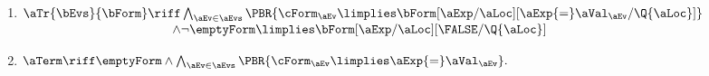\begin{definition}
\begin{multicols}{2}
\begin{enumerate}[topsep=0pt,label=(\textsc{w}\arabic*),ref=\textsc{w}\arabic*]
    
  \item \label{write-tau-ca}
    \begin{math}
      \begin{aligned}[t]
        \aTr{\bEvs}{\bForm} \riff
        &\textstyle\bigwedge_{\aEv\in\aEvs}
        \PBR{
          \cForm_\aEv
          \limplies 
          \bForm[\aExp/\aLoc][\aExp{=}\aVal_\aEv/\Q{\aLoc}]
        }
        \\[-.5ex]
        \land
        &
        \lnot \emptyForm
        \limplies 
        \bForm[\aExp/\aLoc][\FALSE/\Q{\aLoc}]
      \end{aligned}
    \end{math}
  \item \label{write-term-ca}
    \begin{math}
      \aTerm \riff
      \emptyForm
      \land
      \bigwedge_{\aEv\in\aEvs}\PBR{\cForm_\aEv \limplies \aExp{=}\aVal_\aEv}.
    \end{math}
  \end{enumerate}
  \end{multicols}


\end{definition}
